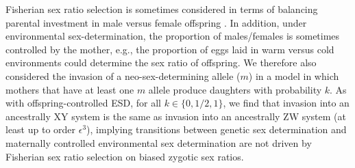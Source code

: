 \documentclass[12pt]{article}
\begin{document}


Fisherian sex ratio selection is sometimes considered in terms of balancing parental investment in male versus female offspring \citep{Charnov:1982wg}.
In addition, under environmental sex-determination, the proportion of males/females is sometimes controlled by the mother, e.g., the proportion of eggs laid in warm versus cold environments could determine the sex ratio of offspring. 
We therefore also considered the invasion of a neo-sex-determining allele ($m$) in a model in which mothers that have at least one $m$ allele produce daughters with probability $k$. 
As with offspring-controlled ESD, for all $k\in\{0,1/2,1\}$, we find that invasion into an ancestrally XY system is the same as invasion into an ancestrally ZW system (at least up to order $\epsilon^3$), implying transitions between genetic sex determination and maternally controlled environmental sex determination are not driven by Fisherian sex ratio selection on biased zygotic sex ratios.
\end{document}
